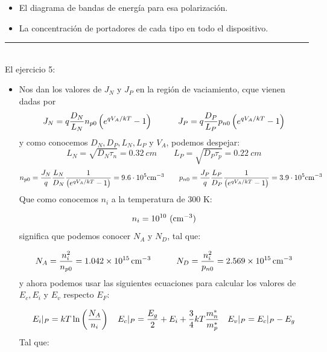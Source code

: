 \begin{itemize}
    \item El diagrama de bandas de energía para esa polarización.
    \item La concentración de portadores de cada tipo en todo el dispositivo.
\end{itemize}


\rule{\textwidth}{0.1pt} \\[2pt]

El ejercicio 5:

\begin{itemize}
    \item Nos dan los valores de $J_N$ y $J_P$ en la región de vaciamiento, cque vienen dadas por
    \begin{equation*}
        J_N = q \frac{D_N}{L_N} n_{p0} \left( e^{qV_A/kT}-1 \right)      \quad \quad \quad    J_P = q \frac{D_P}{L_P} p_{n0} \left( e^{qV_A/kT}-1 \right)
    \end{equation*}
    y como conocemos $D_N,D_P,L_N,L_P$ y $V_A$, podemos despejar:
    \begin{equation}
        L_N = \sqrt{D_N \tau_n} = 0.32 \ \unit{cm} \qquad L_P = \sqrt{D_P \tau_p } = 0.22 \ \unit{cm}
    \end{equation}
    \begin{equation*}
        n_{p0} = \frac{J_N}{q} \frac{L_N}{D_N} \frac{1}{\left( e^{qV_A/kT}-1 \right) } = 9.6\cdot 10^5 \text{cm}^{-3} \qquad p_{n0} = \frac{J_P}{q} \frac{L_P}{D_P} \frac{1}{\left( e^{qV_A/kT}-1 \right) }     = 3.9\cdot 10^5 \text{cm}^{-3} 
    \end{equation*}
    Que como conocemos $n_i$ a la temperatura de 300 K:
    
    \begin{equation*}
        n_i = 10^{10} \ (\text{cm}^{-3})
    \end{equation*}
    significa que podemos conocer $N_A$ y $N_D$, tal que:

    \begin{equation*}
        N_A = \frac{n_i^2}{n_{p0}} = \SI{1.042e+15}{cm^{-3}} \quad \quad \quad N_D = \frac{n_i^2}{p_{n0}} = \SI{2.569e+15}{cm^{-3}} 
    \end{equation*}
    y ahora podemos usar las siguientes ecuaciones para calcular los valores de $E_c,E_i$ y $E_v$ respecto $E_F$: 

    \begin{equation*}
        E_i |_P =  kT \ln \left( \frac{N_A}{n_i} \right) \quad E_c |_P = \frac{E_g}{2} + E_i + \frac{3}{4}kT \frac{m_n^*}{m_p^*} \quad E_v|_P = E_c|_P - E_g
    \end{equation*}
    Tal que:


\end{itemize}

